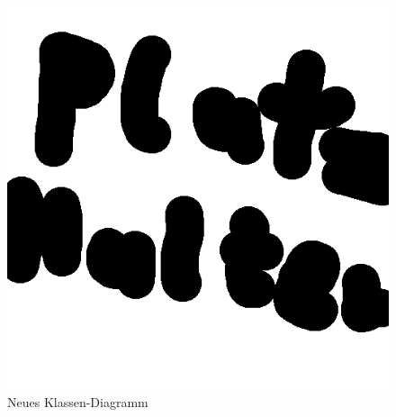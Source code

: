 \begin{figure}[ht]
    \centering
    \includegraphics[width=\textwidth]{figures/classes}
    \caption{Neues Klassen-Diagramm}
    \label{fig:class_diagram}
\end{figure}
